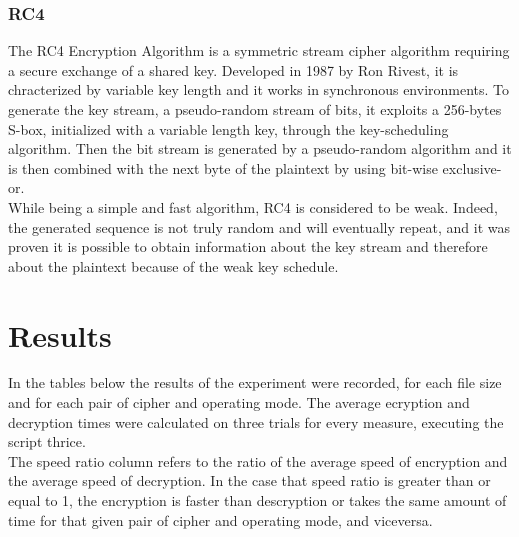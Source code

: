 \documentclass{article}
\begin{document}
\subsubsection{RC4}
The RC4 Encryption Algorithm is a symmetric stream cipher algorithm requiring a secure exchange of a shared key. Developed in 1987 by Ron Rivest, it is chracterized by variable key length and it works in synchronous environments. To generate the key stream, a pseudo-random stream of bits, it exploits a 256-bytes S-box, initialized with a variable length key, through the key-scheduling algorithm. Then the bit stream is generated by a pseudo-random algorithm and it is then combined with the next byte of the plaintext by using bit-wise exclusive-or.\\
While being a simple and fast algorithm, RC4 is considered to be weak. Indeed, the generated sequence is not truly random and will eventually repeat, and it was proven it is possible to obtain information about the key stream and therefore about the plaintext because of the weak key schedule. \\

\section{Results}
In the tables below the results of the experiment were recorded, for each file size and for each pair of cipher and operating mode. The average ecryption and decryption times were calculated on three trials for every measure, executing the script thrice. \\
The speed ratio column refers to the ratio of the average speed of encryption and the average speed of decryption. In the case that speed ratio is greater than or equal to 1, the encryption is faster than descryption or takes the same amount of time for that given pair of cipher and operating mode, and viceversa. \\ \\ \\ \\ \\ \\ \\
\end{document}
